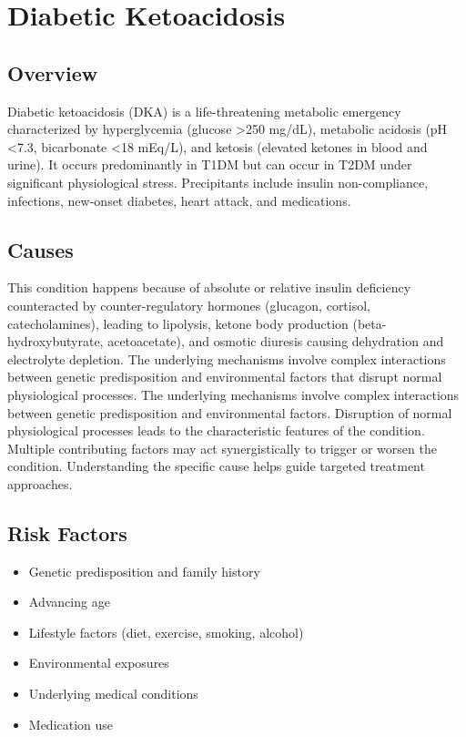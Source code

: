 \chapter{Diabetic Ketoacidosis}
\label{sec:Diabetic Ketoacidosis}

\section{Overview}
Diabetic ketoacidosis (DKA) is a life-threatening metabolic emergency characterized by hyperglycemia (glucose >250 mg/dL), metabolic acidosis (pH <7.3, bicarbonate <18 mEq/L), and ketosis (elevated ketones in blood and urine). It occurs predominantly in T1DM but can occur in T2DM under significant physiological stress. Precipitants include insulin non-compliance, infections, new-onset diabetes, heart attack, and medications.
\section{Causes}
This condition happens because of absolute or relative insulin deficiency counteracted by counter-regulatory hormones (glucagon, cortisol, catecholamines), leading to lipolysis, ketone body production (beta-hydroxybutyrate, acetoacetate), and osmotic diuresis causing dehydration and electrolyte depletion. The underlying mechanisms involve complex interactions between genetic predisposition and environmental factors that disrupt normal physiological processes. The underlying mechanisms involve complex interactions between genetic predisposition and environmental factors. Disruption of normal physiological processes leads to the characteristic features of the condition. Multiple contributing factors may act synergistically to trigger or worsen the condition. Understanding the specific cause helps guide targeted treatment approaches.
\section{Risk Factors}


\begin{itemize}[noitemsep]
  \item Genetic predisposition and family history
  \item Advancing age
  \item Lifestyle factors (diet, exercise, smoking, alcohol)
  \item Environmental exposures
  \item Underlying medical conditions
  \item Medication use
\end{itemize}
